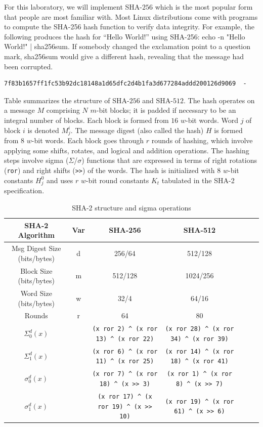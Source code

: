 \documentclass{article}
\begin{document}
For this laboratory, we will implement SHA-$256$ which is the most
popular form that people are most familiar with. Most Linux
distributions come with programs to compute the SHA-256 hash function
to verify data integrity. For example, the following produces the hash
for “Hello World!” using SHA-256: echo -n "Hello World!" |
sha256sum. If somebody changed the exclamation point to a question
mark, sha256sum would give a different hash, revealing that the
message had been corrupted.
\begin{verbatim}
7f83b1657ff1fc53b92dc18148a1d65dfc2d4b1fa3d677284addd200126d9069  -
\end{verbatim}

Table summarizes the structure of SHA-$256$ and SHA-$512$. The hash
operates on a message $M$ comprising $N$ $m$-bit blocks; it is padded if
necessary to be an integral number of blocks. Each block is formed
from $16$ $w$-bit words. Word $j$ of block $i$ is denoted $M_j^{i}$.
The message digest (also called the hash) $H$ is formed from $8$ $w$-bit
words. Each block goes through $r$ rounds of hashing, which involve
applying some shifts, rotates, and logical and addition
operations. The hashing steps involve sigma ($\Sigma$/$\sigma$) functions that are
expressed in terms of right rotations (\verb!ror!) and right shifts (\verb!>>!) of
the words. The hash is initialized with $8$ $w$-bit constants $H_j^{0}$
and uses $r$ $w$-bit round constants $K_t$ tabulated in the SHA-2
specification.
\begin{table}
  \centering
  {\footnotesize
  \begin{tabular}{|c|c|c|c|c|c|c|} \hline
    SHA-2 Algorithm & Var & SHA-256 & SHA-512 \\ \hline \hline
    Msg Digest Size (bits/bytes) & d & 256/64 & 512/128 \\ \hline
    Block Size (bits/bytes) & m & 512/128 & 1024/256 \\ \hline
    Word Size (bits/bytes) & w & 32/4 & 64/16 \\ \hline
    Rounds & r & 64 & 80 \\ \hline
    $\Sigma_0^{d} (x)$ & &
    \verb!(x ror 2) ^ (x ror 13) ^ (x ror 22)! &
    \verb!(x ror 28) ^ (x ror 34) ^ (x ror 39)! \\ \hline
    $\Sigma_1^{d} (x)$ & &
    \verb!(x ror 6) ^ (x ror 11) ^ (x ror 25)! &
    \verb!(x ror 14) ^ (x ror 18) ^ (x ror 41)! \\ \hline
    $\sigma_0^{d} (x)$ & &
    \verb!(x ror 7) ^ (x ror 18) ^ (x >> 3)! &
    \verb!(x ror 1) ^ (x ror 8) ^ (x >> 7)! \\ \hline
    $\sigma_1^{d} (x)$ & &
    \verb!(x ror 17) ^ (x ror 19) ^ (x >> 10)! &
    \verb!(x ror 19) ^ (x ror 61) ^ (x >> 6)! \\ \hline
  \end{tabular}
  }
  \caption{SHA-2 structure and sigma operations}
\end{table}
\end{document}
